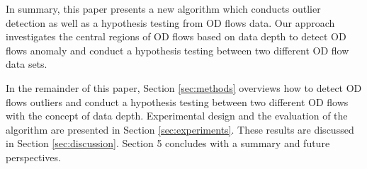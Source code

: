 \documentclass[a4paper,UKenglish]{lipics-v2016}
\begin{document}
In summary, this paper presents a new algorithm which conducts outlier detection as well as a hypothesis testing from OD flows data. Our approach investigates the central regions of  OD flows based on data depth to detect OD flows anomaly and conduct a hypothesis testing between two different OD flow data sets. 

In the remainder of this paper, Section \ref{sec:methods} overviews how to detect OD flows outliers and conduct  a hypothesis testing between two different OD flows with the concept of data depth. Experimental design and the evaluation of the algorithm are presented in Section \ref{sec:experiments}. These results are discussed in Section \ref{sec:discussion}. Section 5 concludes with a summary and future perspectives.


\end{document}
